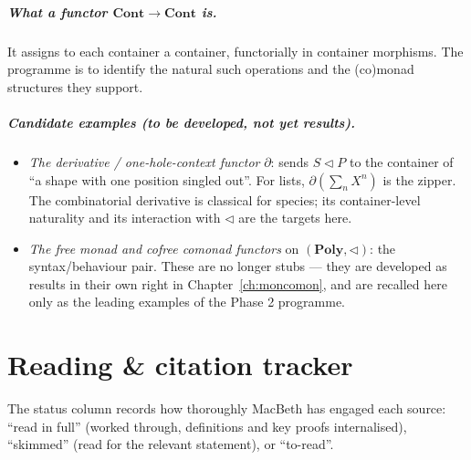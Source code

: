 \documentclass[11pt,a4paper]{book}
\newcommand{\Cont}{\mathbf{Cont}}
\newcommand{\Poly}{\mathbf{Poly}}
\newcommand{\cont}[2]{#1 \triangleleft #2}
\theoremstyle{plain}
\theoremstyle{definition}
\theoremstyle{remark}
\begin{document}
\paragraph{What a functor $\Cont\to\Cont$ is.} It assigns to each container a
container, functorially in container morphisms. The programme is to identify the
natural such operations and the (co)monad structures they support.

\paragraph{Candidate examples (to be developed, not yet results).}
\begin{itemize}[nosep]
  \item \emph{The derivative / one-hole-context functor} $\partial$: sends
        $\cont SP$ to the container of ``a shape with one position singled out''.
        For lists, $\partial(\sum_n X^n)$ is the zipper. The combinatorial
        derivative is classical for species; its container-level naturality and
        its interaction with $\triangleleft$ are the targets here.
  \item \emph{The free monad and cofree comonad functors} on $(\Poly,\triangleleft)$:
        the syntax/behaviour pair. These are no longer stubs --- they are developed as
        results in their own right in Chapter~\ref{ch:moncomon}, and are recalled here only
        as the leading examples of the Phase 2 programme.
\end{itemize}

\appendix
\chapter{Reading \& citation tracker}
\label{app:tracker}

The status column records how thoroughly MacBeth has engaged each source: ``read
in full'' (worked through, definitions and key proofs internalised), ``skimmed''
(read for the relevant statement), or ``to-read''.
\end{document}
